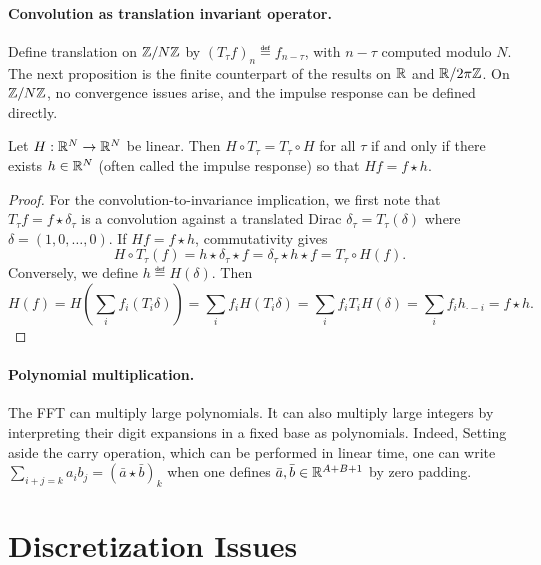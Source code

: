 \paragraph{Convolution as translation invariant operator.}

Define translation on $\mathbb{Z}/N\mathbb{Z}$ by $(T_\tau f)_n \eqdef f_{n-\tau}$, with $n-\tau$ computed modulo $N$. The next proposition is the finite counterpart of the results on $\mathbb{R}$ and $\mathbb{R}/2\pi\mathbb{Z}$. On $\mathbb{Z}/N\mathbb{Z}$, no convergence issues arise, and the impulse response can be defined directly.

\begin{prop}
	Let $H:\mathbb{R}^N\to\mathbb{R}^N$ be linear. Then $H \circ T_\tau = T_\tau \circ H$ for all $\tau$ if and only if there exists $h \in \mathbb{R}^N$ (often called the impulse response) so that $Hf = f \star h$.
\end{prop}

\begin{proof}
	For the convolution-to-invariance implication, we first note that $T_\tau f=f\star\delta_\tau$ is a convolution against a translated Dirac $\delta_\tau=T_\tau(\delta)$ where $\delta=(1,0,\ldots,0)$. If $Hf=f\star h$, commutativity gives
	$$
		H \circ T_\tau(f) = h \star \delta_\tau \star f = \delta_\tau \star h \star f
		= T_\tau \circ H(f).
	$$	
	Conversely, we define $h \eqdef H(\delta)$. Then
	$$
		H(f) = H( \sum_i f_i (T_{i} \delta) ) = \sum_i f_i H(T_i \delta) = \sum_i f_i T_i H(\delta) = \sum_i f_i h_{\cdot-i} = f \star h.
	$$
	 
\end{proof}


\paragraph{Polynomial multiplication.}


The FFT can multiply large polynomials. It can also multiply large integers by interpreting their digit expansions in a fixed base as polynomials. Indeed,
Setting aside the carry operation, which can be performed in linear time,
one can write $\sum_{i+j=k} a_i b_j = (\bar a \star \bar b)_k$ when one defines $\bar a,\bar b\in\mathbb{R}^{A+B+1}$ by zero padding.


\section{Discretization Issues}
\label{sec-fourier-discretization}

